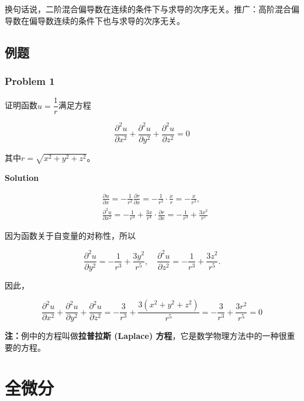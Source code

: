 \documentclass[12pt, a4paper]{article}
\numberwithin{equation}{section}
\begin{document}
    换句话说，二阶混合偏导数在连续的条件下与求导的次序无关。推广：高阶混合偏导数在偏导数连续的条件下也与求导的次序无关。

\subsection{例题}

\subsubsection{Problem 1}

    证明函数\(u=\dfrac{1}{r}\)满足方程

    $$
        \frac{\partial^2 u}{\partial x^2}+\frac{\partial^2 u}{\partial y^2}+\frac{\partial^2 u}{\partial z^2}=0
    $$

    其中\(r=\sqrt{x^2+y^2+z^2}\)。
    \vspace{1em}

    \textbf{Solution}
    \vspace{1em}

    $$
        \begin{aligned}
        & \frac{\partial u}{\partial x}=-\frac{1}{r^2} \frac{\partial r}{\partial x}=-\frac{1}{r^2} \cdot \frac{x}{r}=-\frac{x}{r^3}, \\
        & \frac{\partial^2 u}{\partial x^2}=-\frac{1}{r^3}+\frac{3 x}{r^4} \cdot \frac{\partial r}{\partial x}=-\frac{1}{r^3}+\frac{3 x^2}{r^5}
        \end{aligned}
    $$

    因为函数关于自变量的对称性，所以

    $$
        \frac{\partial^2 u}{\partial y^2}=-\frac{1}{r^3}+\frac{3 y^2}{r^5}, \quad \frac{\partial^2 u}{\partial z^2}=-\frac{1}{r^3}+\frac{3 z^2}{r^5} .
    $$

    因此，

    $$
        \frac{\partial^2 u}{\partial x^2}+\frac{\partial^2 u}{\partial y^2}+\frac{\partial^2 u}{\partial z^2}=
        -\frac{3}{r^3}+\frac{3\left(x^2+y^2+z^2\right)}{r^5}=-\frac{3}{r^3}+\frac{3 r^2}{r^5}=0
    $$
    \vspace{1em}

    \textbf{注：\quad}例中的方程叫做\textbf{拉普拉斯 (Laplace) 方程}，它是数学物理方法中的一种很重要的方程。

\section{全微分}
\end{document}
